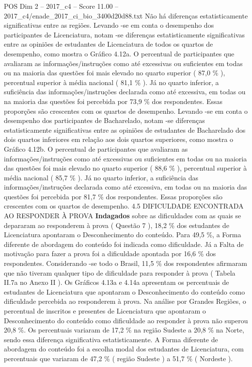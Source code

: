 \begin{textsample}{POS Dim 2 – 2017\_c4 – Score 11.00 – 2017\_c4/enade\_2017\_ci\_bio\_3400d20d88.txt}
Não há diferenças estatisticamente significativas entre as regiões.
Levando -se em conta o desempenho dos participantes de Licenciatura, notam -se diferenças estatisticamente significativas entre as opiniões de estudantes de Licenciatura de todos os quartos de desempenho, como mostra o Gráfico 4.12a.
O percentual de participantes que avaliaram as informações/instruções como até excessivas ou suficientes em todas ou na maioria das questões foi mais elevado no quarto superior ( 87,0 \% ), percentual superior à média nacional ( 81,1 \% ).
Já no quarto inferior, a suficiência das informações/instruções declarada como até excessiva, em todas ou na maioria das questões foi percebida por 73,9 \% dos respondentes.
Essas proporções são crescentes com os quartos de desempenho.
Levando -se em conta o desempenho dos participantes de Bacharelado, notam -se diferenças estatisticamente significativas entre as opiniões de estudantes de Bacharelado dos dois quartos inferiores em relação aos dois quartos superiores, como mostra o Gráfico 4.12b.
O percentual de participantes que avaliaram as informações/instruções como até excessivas ou suficientes em todas ou na maioria das questões foi mais elevado no quarto superior ( 88,6 \% ), percentual superior à média nacional ( 85,7 \% ).
Já no quarto inferior, a suficiência das informações/instruções declarada como até excessiva, em todas ou na maioria das questões foi percebida por 81,7 \% dos respondentes.
Essas proporções são crescentes com os quartos de desempenho. 4.5 DIFICULDADE ENCONTRADA AO RESPONDER À PROVA \textbf{Indagados} sobre as dificuldades com as quais se depararam ao responderem à prova ( Questão 7 ), 18,2 \% dos estudantes de Licenciatura apontaram o Desconhecimento do conteúdo.
Para 49,5 \%, a Forma diferente de abordagem do conteúdo foi indicada como dificuldade.
Já a Falta de motivação para fazer a prova foi a dificuldade apontada por 16,6 \% dos respondentes.
Considerando -se todo o Brasil, 11,5 \% dos respondentes afirmaram que não tiveram qualquer tipo de dificuldade para responder à prova ( Tabela II.7a no Anexo II ).
Os Gráficos 4.13a e 4.14a apresentam os percentuais de estudantes de Licenciatura que apontaram o Desconhecimento do conteúdo como dificuldade percebida ao responderem à prova.
Na análise por Grandes Regiões, o percentual de inscritos e presentes de Licenciatura que apontaram o Desconhecimento do conteúdo como dificuldade ao responder à prova não superou 20,8 \%.
Os percentuais variaram de 17,2 \% na região Sudeste a 20,8 \% na Norte, sendo essa diferença significativa estatisticamente.
A Forma diferente de abordagem do conteúdo foi a escolha modal dos estudantes de Licenciatura, com percentuais que variaram de 47,2 \% ( região Sudeste ) a 51,7 \% ( Nordeste ).

\end{textsample}
